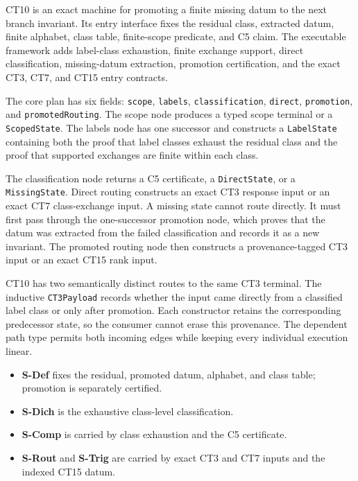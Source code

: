 \documentclass[
  11pt,
]{article}
\providecommand{\tightlist}{%
  \setlength{\itemsep}{0pt}\setlength{\parskip}{0pt}}
\theoremstyle{definition}
\begin{document}
CT10 is an exact machine for promoting a finite missing datum to the next
branch invariant.  Its entry interface fixes the residual class, extracted
datum, finite alphabet, class table, finite-scope predicate, and C5 claim.  The
executable framework adds label-class exhaustion, finite exchange support,
direct classification, missing-datum extraction, promotion certification, and
the exact CT3, CT7, and CT15 entry contracts.

The core plan has six fields: \texttt{scope}, \texttt{labels},
\texttt{classification}, \texttt{direct}, \texttt{promotion}, and
\texttt{promotedRouting}.  The scope node produces a typed scope terminal or
a \texttt{ScopedState}.  The labels node has one successor and constructs a
\texttt{LabelState} containing both the proof that label classes exhaust the
residual class and the proof that supported exchanges are finite within each
class.

The classification node returns a C5 certificate, a
\texttt{DirectState}, or a \texttt{MissingState}.  Direct routing constructs
an exact CT3 response input or an exact CT7 class-exchange input.  A missing
state cannot route directly.  It must first pass through the one-successor
promotion node, which proves that the datum was extracted from the failed
classification and records it as a new invariant.  The promoted routing node
then constructs a provenance-tagged CT3 input or an exact CT15 rank input.

CT10 has two semantically distinct routes to the same CT3 terminal.  The
inductive \texttt{CT3Payload} records whether the input came directly from a
classified label class or only after promotion.  Each constructor retains the
corresponding predecessor state, so the consumer cannot erase this provenance.
The dependent path type permits both incoming edges while keeping every
individual execution linear.

\begin{itemize}
\tightlist
\item \textbf{S-Def} fixes the residual, promoted datum, alphabet, and class table; promotion is separately certified.
\item \textbf{S-Dich} is the exhaustive class-level classification.
\item \textbf{S-Comp} is carried by class exhaustion and the C5 certificate.
\item \textbf{S-Rout} and \textbf{S-Trig} are carried by exact CT3 and CT7 inputs and the indexed CT15 datum.
\end{itemize}
\end{document}
